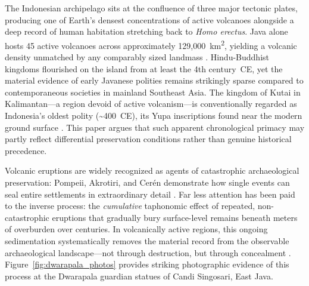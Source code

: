 \documentclass[12pt,a4paper]{article}
\begin{document}
The Indonesian archipelago sits at the confluence of three major tectonic plates, producing one of Earth's densest concentrations of active volcanoes alongside a deep record of human habitation stretching back to \textit{Homo erectus}. Java alone hosts 45 active volcanoes across approximately 129,000~km\textsuperscript{2}, yielding a volcanic density unmatched by any comparably sized landmass \citep{vanbemmelen1949}. Hindu-Buddhist kingdoms flourished on the island from at least the 4th century~CE, yet the material evidence of early Javanese polities remains strikingly sparse compared to contemporaneous societies in mainland Southeast Asia. The kingdom of Kutai in Kalimantan---a region devoid of active volcanism---is conventionally regarded as Indonesia's oldest polity (\textasciitilde400~CE), its Yupa inscriptions found near the modern ground surface \citep{vogel1918,coedes1968}. This paper argues that such apparent chronological primacy may partly reflect differential preservation conditions rather than genuine historical precedence.

Volcanic eruptions are widely recognized as agents of catastrophic archaeological preservation: Pompeii, Akrotiri, and Cer\'en demonstrate how single events can seal entire settlements in extraordinary detail \citep{sigurdsson1985,doumas1983,sheets1992}. Far less attention has been paid to the inverse process: the \textit{cumulative} taphonomic effect of repeated, non-catastrophic eruptions that gradually bury surface-level remains beneath meters of overburden over centuries. In volcanically active regions, this ongoing sedimentation systematically removes the material record from the observable archaeological landscape---not through destruction, but through concealment \citep{torrence2002,grattan2006}. Figure~\ref{fig:dwarapala_photos} provides striking photographic evidence of this process at the Dwarapala guardian statues of Candi Singosari, East Java.
\end{document}
